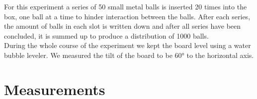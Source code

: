 \documentclass{scrreprt}
\begin{document}
For this experiment a series of 50 small metal balls is inserted 20 times into the box, one ball at a time to hinder interaction between the balls. After each series, the amount of balls in each slot is written down and after all series have been concluded, it is summed up to produce a distribution of 1000 balls.\\
During the whole course of the experiment we kept the board level using a water bubble leveler. We measured the tilt of the board to be $\ang{60}$ to the horizontal axis.

\section{Measurements}

\begin{table}[H]
  \centering
  

\end{table}
\end{document}

